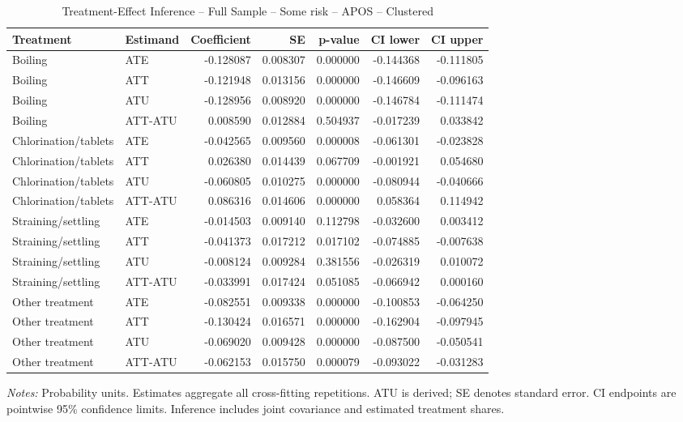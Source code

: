 \begin{table}[htbp]
\centering
\caption{Treatment-Effect Inference -- Full Sample -- Some risk -- APOS -- Clustered}
\label{tab:inference-SomeRiskHome-APOS}
\scriptsize
\begin{adjustbox}{max width=\linewidth}
\begin{tabular}{llrrrrr}
\toprule
Treatment & Estimand & Coefficient & SE & p-value & CI lower & CI upper \\
\midrule
Boiling & ATE & -0.128087 & 0.008307 & 0.000000 & -0.144368 & -0.111805 \\
Boiling & ATT & -0.121948 & 0.013156 & 0.000000 & -0.146609 & -0.096163 \\
Boiling & ATU & -0.128956 & 0.008920 & 0.000000 & -0.146784 & -0.111474 \\
Boiling & ATT-ATU & 0.008590 & 0.012884 & 0.504937 & -0.017239 & 0.033842 \\
Chlorination/tablets & ATE & -0.042565 & 0.009560 & 0.000008 & -0.061301 & -0.023828 \\
Chlorination/tablets & ATT & 0.026380 & 0.014439 & 0.067709 & -0.001921 & 0.054680 \\
Chlorination/tablets & ATU & -0.060805 & 0.010275 & 0.000000 & -0.080944 & -0.040666 \\
Chlorination/tablets & ATT-ATU & 0.086316 & 0.014606 & 0.000000 & 0.058364 & 0.114942 \\
Straining/settling & ATE & -0.014503 & 0.009140 & 0.112798 & -0.032600 & 0.003412 \\
Straining/settling & ATT & -0.041373 & 0.017212 & 0.017102 & -0.074885 & -0.007638 \\
Straining/settling & ATU & -0.008124 & 0.009284 & 0.381556 & -0.026319 & 0.010072 \\
Straining/settling & ATT-ATU & -0.033991 & 0.017424 & 0.051085 & -0.066942 & 0.000160 \\
Other treatment & ATE & -0.082551 & 0.009338 & 0.000000 & -0.100853 & -0.064250 \\
Other treatment & ATT & -0.130424 & 0.016571 & 0.000000 & -0.162904 & -0.097945 \\
Other treatment & ATU & -0.069020 & 0.009428 & 0.000000 & -0.087500 & -0.050541 \\
Other treatment & ATT-ATU & -0.062153 & 0.015750 & 0.000079 & -0.093022 & -0.031283 \\
\bottomrule
\end{tabular}

\end{adjustbox}
\par\smallskip
\begin{minipage}{\linewidth}\scriptsize \textit{Notes:} Probability units. Estimates aggregate all cross-fitting repetitions. ATU is derived; SE denotes standard error. CI endpoints are pointwise 95\% confidence limits. Inference includes joint covariance and estimated treatment shares. \end{minipage}
\end{table}

